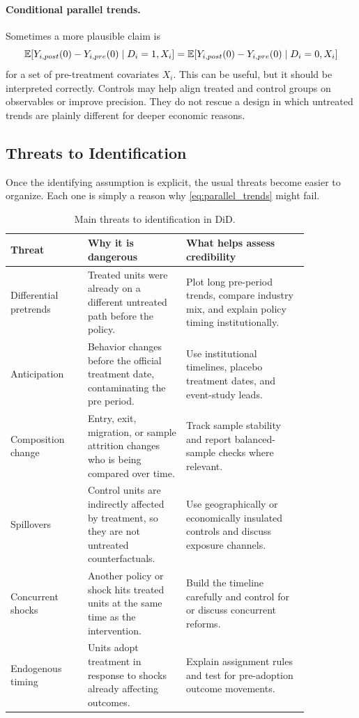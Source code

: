 \paragraph{Conditional parallel trends.}
Sometimes a more plausible claim is
\[
\mathbb{E}[Y_{i,post}(0)-Y_{i,pre}(0)\mid D_i=1,X_i]
=
\mathbb{E}[Y_{i,post}(0)-Y_{i,pre}(0)\mid D_i=0,X_i]
\]
for a set of pre-treatment covariates $X_i$. This can be useful, but it should be interpreted correctly. Controls may help align treated and control groups on observables or improve precision. They do not rescue a design in which untreated trends are plainly different for deeper economic reasons.

\subsection{Threats to Identification}
Once the identifying assumption is explicit, the usual threats become easier to organize. Each one is simply a reason why \eqref{eq:parallel_trends} might fail.

\begin{table}[h]
\centering
\small
\begin{tabular}{p{0.22\linewidth}p{0.28\linewidth}p{0.35\linewidth}}
\toprule
Threat & Why it is dangerous & What helps assess credibility \\
\midrule
Differential pretrends & Treated units were already on a different untreated path before the policy. & Plot long pre-period trends, compare industry mix, and explain policy timing institutionally. \\
Anticipation & Behavior changes before the official treatment date, contaminating the pre period. & Use institutional timelines, placebo treatment dates, and event-study leads. \\
Composition change & Entry, exit, migration, or sample attrition changes who is being compared over time. & Track sample stability and report balanced-sample checks where relevant. \\
Spillovers & Control units are indirectly affected by treatment, so they are not untreated counterfactuals. & Use geographically or economically insulated controls and discuss exposure channels. \\
Concurrent shocks & Another policy or shock hits treated units at the same time as the intervention. & Build the timeline carefully and control for or discuss concurrent reforms. \\
Endogenous timing & Units adopt treatment in response to shocks already affecting outcomes. & Explain assignment rules and test for pre-adoption outcome movements. \\
\bottomrule
\end{tabular}
\caption{Main threats to identification in \ac{DiD}.}
\label{tab:did_threats}
\end{table}

